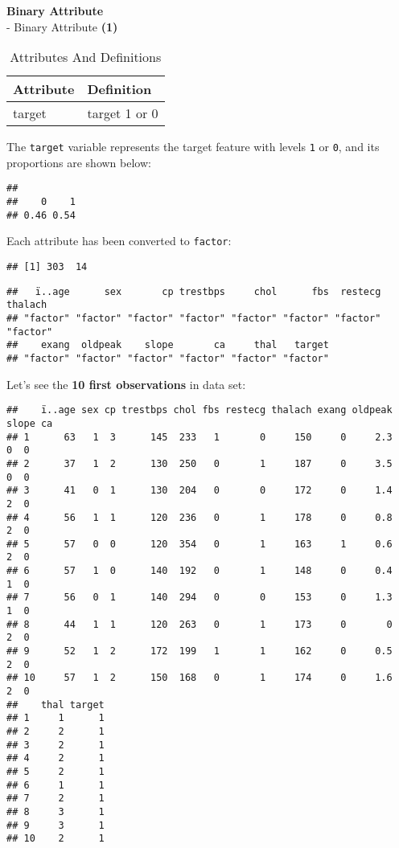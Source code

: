 \documentclass[]{article}
\begin{document}
\textbf{\textcolor{my.dark.gray}{Binary Attribute}}\\
- \textcolor{my.orange}{Binary Attribute}
\textbf{\textcolor{my.dark.gray}{(1)}}

\begin{table}[!h]

\caption{\label{tab:table.binary.attribute}Attributes And Definitions}
\centering
\begin{tabular}{ll}
\toprule
Attribute & Definition\\
\midrule
\rowcolor{gray!6}  target & target 1 or 0\\
\bottomrule
\end{tabular}
\end{table}

The \texttt{target} variable represents the target feature with levels
\texttt{1} or \texttt{0}, and its proportions are shown below:

\begin{verbatim}
## 
##    0    1 
## 0.46 0.54
\end{verbatim}

Each attribute has been converted to \texttt{factor}:

\begin{verbatim}
## [1] 303  14
\end{verbatim}

\begin{verbatim}
##   ï..age      sex       cp trestbps     chol      fbs  restecg  thalach 
## "factor" "factor" "factor" "factor" "factor" "factor" "factor" "factor" 
##    exang  oldpeak    slope       ca     thal   target 
## "factor" "factor" "factor" "factor" "factor" "factor"
\end{verbatim}

Let's see the \textbf{\textcolor{my.red}{10 first observations}} in data
set:

\begin{verbatim}
##    ï..age sex cp trestbps chol fbs restecg thalach exang oldpeak slope ca
## 1      63   1  3      145  233   1       0     150     0     2.3     0  0
## 2      37   1  2      130  250   0       1     187     0     3.5     0  0
## 3      41   0  1      130  204   0       0     172     0     1.4     2  0
## 4      56   1  1      120  236   0       1     178     0     0.8     2  0
## 5      57   0  0      120  354   0       1     163     1     0.6     2  0
## 6      57   1  0      140  192   0       1     148     0     0.4     1  0
## 7      56   0  1      140  294   0       0     153     0     1.3     1  0
## 8      44   1  1      120  263   0       1     173     0       0     2  0
## 9      52   1  2      172  199   1       1     162     0     0.5     2  0
## 10     57   1  2      150  168   0       1     174     0     1.6     2  0
##    thal target
## 1     1      1
## 2     2      1
## 3     2      1
## 4     2      1
## 5     2      1
## 6     1      1
## 7     2      1
## 8     3      1
## 9     3      1
## 10    2      1
\end{verbatim}
\end{document}
